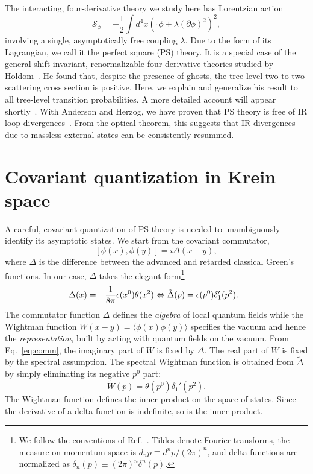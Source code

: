 \documentclass[pra,aps,amsmath,amssymb,notitlepage, twocolumn,superscriptaddress,longbibliography,nofootinbib,floatfix,10pt]{revtex4-2}
\begin{document}
The interacting, four-derivative theory we study here has Lorentzian action
\begin{equation}\label{eq:PStheory}
		 \mathcal{S}_\phi = -\frac{1}{2}\int d^4x \left(\square \phi+\lambda (\partial \phi)^2\right)^2,
	\end{equation}
involving a single, asymptotically free coupling $\lambda$. Due to the form of its Lagrangian, we call it the perfect square (PS) theory. It is a special case of the general shift-invariant, renormalizable four-derivative theories studied by Holdom~\cite{Holdom:2023usn,Holdom:2024cfq}. He found that, despite the presence of ghosts, the tree level two-to-two scattering cross section is positive. Here, we explain and generalize his result to all tree-level transition probabilities.  A more detailed account will appear shortly~\cite{BTlong}. With Anderson and Herzog, we have proven that PS theory is free of IR loop divergences~\cite{ABHTlong}. From the optical theorem, this suggests that IR divergences due to massless external states can be consistently resummed.

\section{Covariant quantization in Krein space}

A careful, covariant quantization of PS theory is needed to unambiguously identify its asymptotic states.  We start from the covariant commutator,
\begin{equation}
\label{eq:comm}
		[\phi(x),\phi(y)] = i \Delta(x-y),
	\end{equation}
    where $\Delta$ is the difference between the advanced and retarded classical Green's functions.
In our case,  $\Delta$ takes the elegant form\footnote{We follow the conventions of Ref.~\cite{Bogolubov:1990ask}. Tildes denote Fourier transforms, the measure on momentum space is $d_n p\equiv d^n p/(2 \pi)^n$, and delta functions are normalized as $\delta_n(p)\equiv (2 \pi)^n \delta^n (p)$.}
\begin{equation}\label{eq:eq:DeltaFun}
\hspace{-.22cm}	\Delta(x) = -\frac1{8\pi}\epsilon(x^0)\theta(x^2) 
    \Leftrightarrow  \tilde{\Delta}(p)=\epsilon(p^0) \delta'_1(p^2).
\end{equation}
The commutator function $\Delta$ defines the {\it algebra} of local quantum fields while the Wightman function $W(x-y)=\langle \phi(x) \phi(y)\rangle$ specifies the vacuum and hence the {\it representation}, built by acting with quantum fields on the vacuum. From Eq.~\eqref{eq:comm}, the imaginary part of $W$ is fixed by $\Delta$. The real part of $W$ is fixed by the spectral assumption.
The spectral Wightman function is obtained from $\tilde{\Delta}$ by simply eliminating its negative $p^0$ part: 
    \begin{equation}\label{eq:Wightman}
		\tilde{W}(p) =  \theta(p^0)\delta_1'(p^2). 
	\end{equation}
The Wightman function defines the inner product on the space of states. Since the derivative of a delta function is indefinite, so is the inner product.
\end{document}
